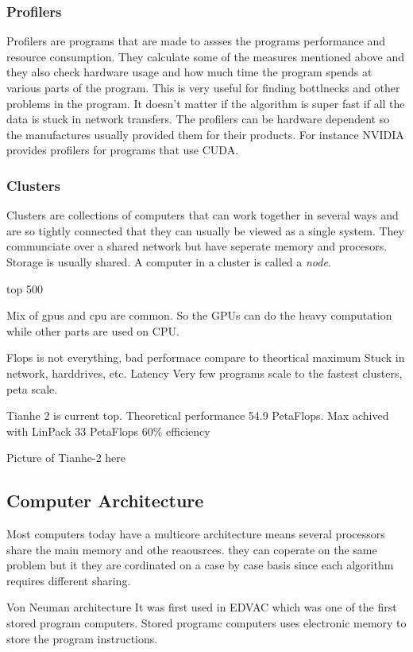 \documentclass[10pt,a4paper]{article}
\begin{document}
\subsubsection{Profilers}
Profilers are programs that are made to assses the programs performance and resource consumption. They calculate some of the measures mentioned above and they also check hardware usage and how much time the program spends at various parts of the program. This is very useful for finding bottlnecks and other problems in the program. It doesn't matter if the algorithm is super fast if all the data is stuck in network transfers. The profilers can be hardware dependent so the manufactures usually provided them for their products. For instance NVIDIA provides profilers for programs that use CUDA.

\subsubsection{Clusters}
Clusters are collections of computers that can work together in several ways and are so tightly connected that they can usually be viewed as a single system. They communciate over a shared network but have seperate memory and procesors. Storage is usually shared. A computer in a cluster is called a \emph{node}. \cite{intro_hpc}

top 500\cite{TOP500}

Mix of gpus and cpu are common. So the GPUs can do the heavy computation while other parts are used on CPU.

Flops is not everything, bad performace compare to theortical maximum
Stuck in network, harddrives, etc. Latency
Very few programs scale to the fastest clusters, peta scale.

Tianhe 2 is current top. Theoretical performance 54.9 PetaFlops.\cite{TOP500}
Max achived with LinPack 33 PetaFlops
60\% efficiency

Picture of Tianhe-2 here

\clearpage
\subsection{Computer Architecture}
Most computers today have a multicore architecture
means several processors share the main memory and othe reaousrces. they can coperate on the same problem but it they are cordinated on a case by case basis since each algorithm requires different sharing.

Von Neuman architecture
It was first used in EDVAC which was one of the first stored program computers\cite{von1993first}. Stored programc computers uses electronic memory to store the program instructions\cite{computer_arch_2003}.
\end{document}
